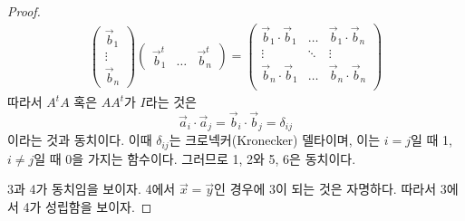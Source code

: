 \documentclass[sections/engineering_mathematics_lecture_note.tex]{subfiles}
\begin{document}
\begin{proof}
\begin{align*}
\begin{pmatrix}
            \vec b_1 \\ \vdots \\ \vec b_n
        \end{pmatrix}
        \begin{pmatrix}
            \vec b_1^t & \dots & \vec b_n^t
        \end{pmatrix}
        =
        \begin{pmatrix}
            \vec b_1 \cdot \vec b_1 & \dots & \vec b_1 \cdot \vec b_n\\
            \vdots & \ddots & \vdots\\
            \vec b_n \cdot \vec b_1 & \dots & \vec b_n \cdot \vec b_n\\
        \end{pmatrix}
    \end{align*}
    따라서 $A^t A$ 혹은 $AA^t$가 $I$라는 것은
    \begin{equation*}
        \vec a_i \cdot \vec a_j = \vec b_i \cdot \vec b_j = \delta_{ij}
    \end{equation*}
    이라는 것과 동치이다.
    이때 $\delta_{ij}$는 크로넥커(Kronecker) 델타이며, 이는 $i = j$일 때 1, $i \neq j$일 때 0을 가지는 함수이다.
    그러므로 1, 2와 5, 6은 동치이다.

    3과 4가 동치임을 보이자.
    4에서 $\vec x = \vec y$인 경우에 3이 되는 것은 자명하다.
    따라서 3에서 4가 성립함을 보이자.


\end{proof}
\end{document}
